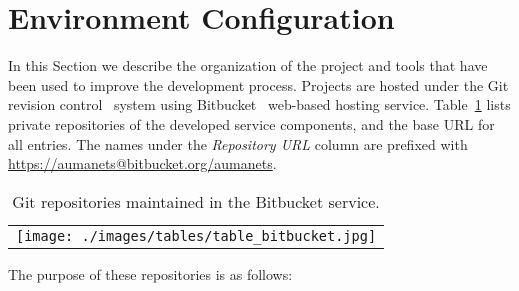 \section{Environment Configuration}
\label{subsubsec:environment-configuration}
In this Section we describe the organization of the project and tools that have been used to improve the development process. Projects are hosted under the Git revision control~\cite{git} system using Bitbucket~\cite{Bitbucket} web-based hosting service. Table~\ref{tab:bitbucketRepositories} lists private repositories of the developed service components, and the base URL for all entries. The names under the \emph{Repository URL} column are prefixed with \url{https://aumanets@bitbucket.org/aumanets}.
\begin{center}
\begin{table}
    \centering
    \caption{Git repositories maintained in the Bitbucket service.} 
    \label{tab:bitbucketRepositories}
    \begin{tabular}{c}
	\texttt{[image: ./images/tables/table\_bitbucket.jpg]}    
    \end{tabular}
    \end{table}
\end{center}
The purpose of these repositories is as follows:
